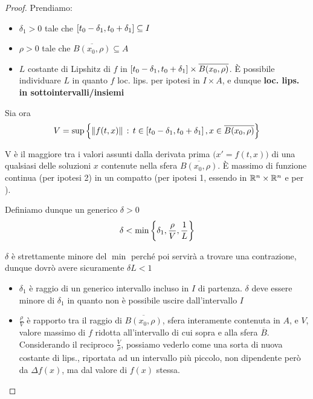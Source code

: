 \begin{theorem}
\begin{proof}
		Prendiamo:
		\begin{itemize}
			\item $\delta_1>0$ tale che $\left[t_0-\delta_1,t_0+\delta_1\right]\subseteq I$
			\item $\rho>0$ tale che $\overline{B(x_0,\rho)}\subseteq A$
			\item $L$ costante di Lipshitz di $f$ in $\left[t_0-\delta_1,t_0+\delta_1\right]\times\overline{B(x_0,\rho)}$. È possibile individuare $L$ in quanto $f$ loc. lips. per ipotesi in $I\times A$, e dunque \textbf{loc. lips. in sottointervalli/insiemi}
		\end{itemize}
		Sia ora
		$$V = \sup\left\{\left\|f(t,x)\right\|\,:\,t\in\left[t_0-\delta_1,t_0+\delta_1\right],x\in\overline{B(x_0,\rho)}\right\}$$
		\begin{note}
			V è il maggiore tra i valori assunti dalla derivata prima $\bigl(x'=f(t,x)\bigr)$ di una qualsiasi delle soluzioni $x$ contenute nella sfera $\overline{B(x_0,\rho)}$. È massimo di funzione continua (per ipotesi 2) in un compatto (per ipotesi 1, essendo in $\mathbb{R}^n\times\mathbb{R}^n$ e per ).\\%
		\end{note}
		\noindent Definiamo dunque un generico $\delta>0$
		\begin{equation}
			\label{eq:cau_delta}
			\delta<\min\left\{\delta_1,\frac{\rho}{V},\frac{1}{L}\right\}
		\end{equation}
		\begin{note}
			$\delta$ è strettamente minore del $\min$ perché poi servirà a trovare una contrazione, dunque dovrò avere sicuramente $\delta L < 1$
		\end{note}
		\begin{itemize}
			\item $\delta_1$ è raggio di un generico intervallo incluso in $I$ di partenza. $\delta$ deve essere minore di $\delta_1$ in quanto non è possibile uscire dall'intervallo $I$
			\item $\frac{\rho}{V}$ è rapporto tra il raggio di $\overline{B(x_0,\rho)}$, sfera interamente contenuta in $A$, e $V$, valore massimo di $f$ ridotta all'intervallo di cui sopra e alla sfera $\overline{B}$.\\
			Considerando il reciproco $\frac{V}{\rho}$, possiamo vederlo come una sorta di nuova costante di lips., riportata ad un intervallo più piccolo, non dipendente però da $\Delta f(x)$, ma dal valore di $f(x)$ stessa.

\end{itemize}
\end{proof}
\end{theorem}
